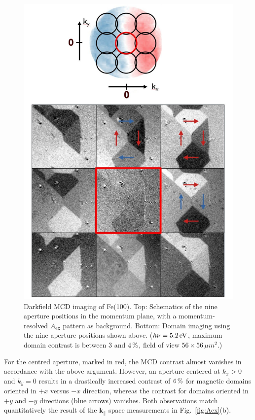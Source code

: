 \documentclass[prl,twocolumn,floatfix,superscriptaddress]{revtex4-2}
\renewcommand{\vec}[1]{\boldsymbol{#1}}
\begin{document}
\begin{figure}
    \centering
    \includegraphics[width = 0.7\columnwidth]{Darkfield_overview.pdf}
    \caption{Darkfield MCD imaging of Fe(100). Top: Schematics of the nine aperture positions in the momentum plane, with a momentum-resolved $A_{\mathrm{ex}}$ pattern as background. Bottom: Domain imaging using the nine aperture positions shown above. ($h \nu = \unit[5.2]{eV}$, 
    maximum domain contrast is between 3 and $\unit[4]{\%}$, field of view $56\times56\,\mu m^2$.)}
    \label{fig:Imaging}
\end{figure}

For the centred aperture, marked in red, the MCD contrast almost vanishes in accordance with the above argument. However, an aperture centered at $k_x > 0$ and $k_y = 0$ results in a drastically increased contrast of $\unit[6]{\%}$ for magnetic domains oriented in $+x$ versus $-x$ direction, whereas the contrast for domains oriented in $+y$ and $-y$ directions (blue arrows) vanishes. Both observations match quantitatively the result of the $\vec{k}_{\parallel}$ space measurements in Fig.~\ref{fig:Aex}(b). 
\end{document}
